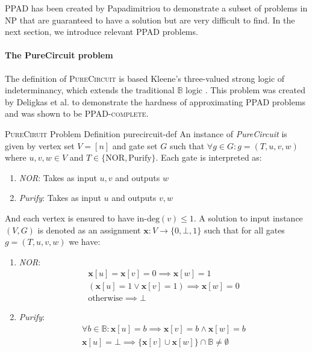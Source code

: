 \textsc{PPAD} has been created by Papadimitriou \cite{papadimitriou_ComplexityParityArgument_1994}
to demonstrate a subset of problems in \textsc{NP} that are guaranteed to have
a solution but are very difficult to find.
In the next section,
we introduce relevant \textsc{PPAD} problems.

\paragraph{The PureCircuit problem}
\label{par:pure-circ-def}

The definition of \textsc{PureCircuit} is based Kleene's three-valued strong logic of indeterminancy,
which extends the traditional $\mathbb{B}$ logic \cite{kleene_IntroductionMetamathematics_2009}.
This problem was created by Deligkas et al. \cite{deligkas_PureCircuitTightInapproximability_2024}
to demonstrate the hardness of approximating \textsc{PPAD} problems and was shown to be \textsc{PPAD-complete}.


\begin{definitionbox}{\textsc{PureCiruit} Problem Definition \cite{deligkas_PureCircuitTightInapproximability_2024}}{purecircuit-def}
An instance of \textit{PureCircuit} is given by vertex set $V= [n]$ and gate set $G$ such that
$\forall g \in G: g=(T,u,v,w)$ where $u,v,w \in V$ and $T \in \{\text{NOR}, \text{Purify}\}$.
Each gate is interpreted as:
\begin{enumerate}
    \item \textit{NOR}: Takes as input $u,v$ and outputs $w$
    \item \textit{Purify}: Takes as input $u$ and outputs $v,w$
\end{enumerate}
And each vertex is ensured to have $\text{in-deg}(v) \leq 1$.
A solution to input instance $(V,G)$ is denoted as an assignment $\mathbf{x} : V \to \{0, \bot, 1\}$
such that for all gates $g = (T,u,v,w)$ we have:
\begin{enumerate}
    \item \textit{NOR}:
       \begin{gather*}
            \mathbf{x}[u] = \mathbf{x}[v] = 0 \implies \mathbf{x}[w] = 1\\
            (\mathbf{x}[u] =1 \vee \mathbf{x}[v] =1) \implies \mathbf{x}[w] = 0 \\
            \text{otherwise} \implies \bot
        \end{gather*}

    \item \textit{Purify}: 
       \begin{gather*}
           \forall b \in \mathbb{B}: \mathbf{x}[u] = b \implies \mathbf{x}[v] = b \wedge \mathbf{x}[w] =  b\\
           \mathbf{x}[u] = \bot \implies \{\mathbf{x}[v] \cup \mathbf{x}[w] \} \cap \mathbb{B}\neq \emptyset
        \end{gather*}
\end{enumerate}
\end{definitionbox}

